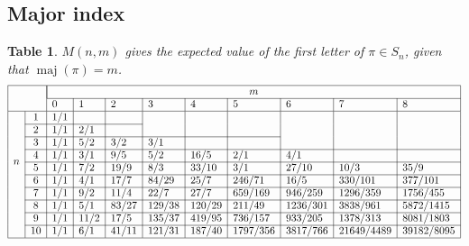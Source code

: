 \documentclass{article}
\newcommand{\n}[1]{\multicolumn{1}{|c|}{#1}}
\newtheorem{datatable}[theo]{Table}
\begin{document}
\subsection{Major index}
\begin{datatable} $M(n, m)$ gives the expected value of the first letter of
  $\pi \in S_n$, given that $\operatorname{maj}(\pi) = m$.
\[
  \begin{array}{|ll|l|l|l|l|l|l|l|l|l|}
  \hline
  & & \multicolumn{9}{|c|}{m} \\ \cline{3-11}
  & & 0 & 1 & 2 & 3 & 4 & 5 & 6 & 7 & 8\\ \hline
  \multirow{8}{*}{$n$}
  & \n{1}  & 1/1 &      &       &        &        &          &          &            &            \\ \cline{2-5}
  & \n{2}  & 1/1 & 2/1  &       &        &        &          &          &            &            \\ \cline{2-8}
  & \n{3}  & 1/1 & 5/2  & 3/2   & 3/1    &        &          &          &            &            \\ \cline{2-11}
  & \n{4}  & 1/1 & 3/1  & 9/5   & 5/2    & 16/5   & 2/1      & 4/1      &            &            \\ \cline{2-11}
  & \n{5}  & 1/1 & 7/2  & 19/9  & 8/3    & 33/10  & 3/1      & 27/10    & 10/3       & 35/9       \\ \cline{2-11}
  & \n{6}  & 1/1 & 4/1  & 17/7  & 84/29  & 25/7   & 246/71   & 16/5     & 330/101    & 377/101    \\ \cline{2-11}
  & \n{7}  & 1/1 & 9/2  & 11/4  & 22/7   & 27/7   & 659/169  & 946/259  & 1296/359   & 1756/455   \\ \cline{2-11}
  & \n{8}  & 1/1 & 5/1  & 83/27 & 129/38 & 120/29 & 211/49   & 1236/301 & 3838/961   & 5872/1415  \\ \cline{2-11}
  & \n{9}  & 1/1 & 11/2 & 17/5  & 135/37 & 419/95 & 736/157  & 933/205  & 1378/313   & 8081/1803  \\ \cline{2-11}
  & \n{10} & 1/1 & 6/1  & 41/11 & 121/31 & 187/40 & 1797/356 & 3817/766 & 21649/4489 & 39182/8095 \\ \hline
  \end{array}
\]
\end{datatable}
\end{document}
